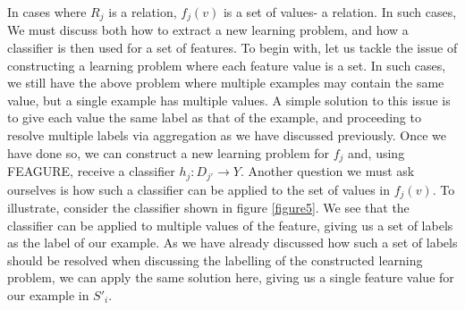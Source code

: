\documentclass[twoside,11pt]{article}
\theoremstyle{definition}
\begin{document}
 In cases where $R_j$ is a relation, $f_j(v)$ is a set of values- a relation. In such cases, We must discuss both how to extract a new learning problem, and how a classifier is then used for a set of features.
 To begin with, let us tackle the issue of constructing a learning problem where each feature value is a set. In such cases, we still have the above problem where multiple examples may contain the same value, but a single example has multiple values. A simple solution to this issue is to give each value the same label as that of the example, and proceeding to resolve multiple labels via aggregation as we have discussed previously. 
 Once we have done so, we can construct a new learning problem for $f_j$ and, using FEAGURE, receive a classifier $h_j:D_{j'}\rightarrow Y$.
 Another question we must ask ourselves is how such a classifier can be applied to the set of values in $f_j(v)$. To illustrate, consider the classifier shown in figure \ref{figure5}. We see that the classifier can be applied to multiple values of the feature, giving us a set of labels as the label of our example. As we have already discussed how such a set of labels should be resolved when discussing the labelling of the constructed learning problem, we can apply the same solution here, giving us a single feature value for our example in $S'_i$.
\end{document}
